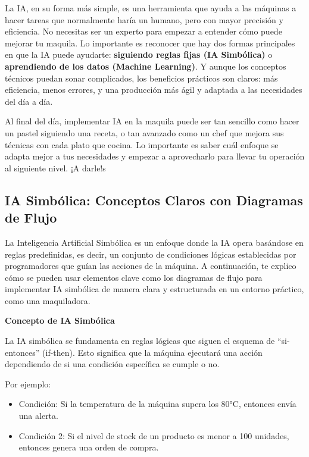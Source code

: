 \documentclass[
  10pt,
  letterpaper,
]{book}
\providecommand{\tightlist}{%
  \setlength{\itemsep}{0pt}\setlength{\parskip}{0pt}}\usepackage{longtable,booktabs,array}
\begin{document}
La IA, en su forma más simple, es una herramienta que ayuda a las
máquinas a hacer tareas que normalmente haría un humano, pero con mayor
precisión y eficiencia. No necesitas ser un experto para empezar a
entender cómo puede mejorar tu maquila. Lo importante es reconocer que
hay dos formas principales en que la IA puede ayudarte:
\textbf{siguiendo reglas fijas (IA Simbólica)} o \textbf{aprendiendo de
los datos (Machine Learning)}. Y aunque los conceptos técnicos puedan
sonar complicados, los beneficios prácticos son claros: más eficiencia,
menos errores, y una producción más ágil y adaptada a las necesidades
del día a día.

Al final del día, implementar IA en la maquila puede ser tan sencillo
como hacer un pastel siguiendo una receta, o tan avanzado como un chef
que mejora sus técnicas con cada plato que cocina. Lo importante es
saber cuál enfoque se adapta mejor a tus necesidades y empezar a
aprovecharlo para llevar tu operación al siguiente nivel. ¡A darle!s

\subsection{IA Simbólica: Conceptos Claros con Diagramas de
Flujo}\label{ia-simbuxf3lica-conceptos-claros-con-diagramas-de-flujo}

La Inteligencia Artificial Simbólica es un enfoque donde la IA opera
basándose en reglas predefinidas, es decir, un conjunto de condiciones
lógicas establecidas por programadores que guían las acciones de la
máquina. A continuación, te explico cómo se pueden usar elementos clave
como los diagramas de flujo para implementar IA simbólica de manera
clara y estructurada en un entorno práctico, como una maquiladora.

\textbf{Concepto de IA Simbólica}

La IA simbólica se fundamenta en reglas lógicas que siguen el esquema de
``si-entonces'' (if-then). Esto significa que la máquina ejecutará una
acción dependiendo de si una condición específica se cumple o no.

Por ejemplo:

\begin{itemize}
\tightlist
\item
  Condición: Si la temperatura de la máquina supera los 80°C, entonces
  envía una alerta.
\item
  Condición 2: Si el nivel de stock de un producto es menor a 100
  unidades, entonces genera una orden de compra.
\end{itemize}
\end{document}
